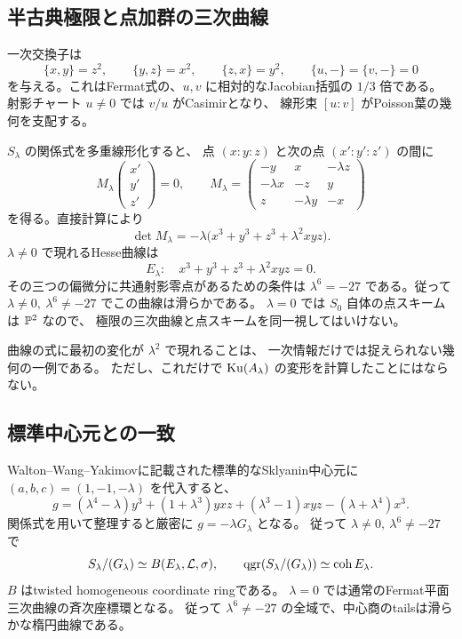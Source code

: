 \subsection{半古典極限と点加群の三次曲線}

一次交換子は
\[
 \{x,y\}=z^2,\qquad\{y,z\}=x^2,\qquad\{z,x\}=y^2,
 \qquad \{u,-\}=\{v,-\}=0
\]
を与える。これはFermat式の、$u,v$ に相対的なJacobian括弧の $1/3$ 倍である。
射影チャート $u\ne0$ では $v/u$ がCasimirとなり、
線形束 $[u:v]$ がPoisson葉の幾何を支配する。

$S_\lambda$ の関係式を多重線形化すると、
点 $(x:y:z)$ と次の点 $(x':y':z')$ の間に
\[
 M_\lambda
 \begin{pmatrix}x'\\y'\\z'\end{pmatrix}=0,\qquad
 M_\lambda=
 \begin{pmatrix}
 -y&x&-\lambda z\\
 -\lambda x&-z&y\\
 z&-\lambda y&-x
 \end{pmatrix}
\]
を得る。直接計算により
\[
 \det M_\lambda=-\lambda\bigl(x^3+y^3+z^3+\lambda^2xyz\bigr).
\]
$\lambda\ne0$ で現れるHesse曲線は
\begin{equation}\label{eq:elliptic}
 E_\lambda:\quad x^3+y^3+z^3+\lambda^2xyz=0.
\end{equation}
その三つの偏微分に共通射影零点があるための条件は
$\lambda^6=-27$ である。従って
$\lambda\ne0,\ \lambda^6\ne-27$ でこの曲線は滑らかである。
$\lambda=0$ では $S_0$ 自体の点スキームは $\mathbb P^2$ なので、
極限の三次曲線と点スキームを同一視してはいけない。

曲線の式に最初の変化が $\lambda^2$ で現れることは、
一次情報だけでは捉えられない幾何の一例である。
ただし、これだけで $\operatorname{Ku}(A_\lambda)$ の変形を計算したことにはならない。

\subsection{標準中心元との一致}

Walton--Wang--Yakimov\cite[Lemma 2.19]{WWY}に記載された標準的なSklyanin中心元に
$(a,b,c)=(1,-1,-\lambda)$ を代入すると、
\[
 g=(\lambda^4-\lambda)y^3+(1+\lambda^3)yxz
       +(\lambda^3-1)xyz-(\lambda+\lambda^4)x^3.
\]
関係式を用いて整理すると厳密に $g=-\lambda G_\lambda$ となる。
従って $\lambda\ne0,\ \lambda^6\ne-27$ で
\[
 S_\lambda/(G_\lambda)\simeq B(E_\lambda,\mathcal L,\sigma),
 \qquad
 \operatorname{qgr}(S_\lambda/(G_\lambda))\simeq\operatorname{coh}E_\lambda.
\]
$B$ はtwisted homogeneous coordinate ringである。
$\lambda=0$ では通常のFermat平面三次曲線の斉次座標環となる。
従って $\lambda^6\ne-27$ の全域で、中心商のtailsは滑らかな楕円曲線である。


